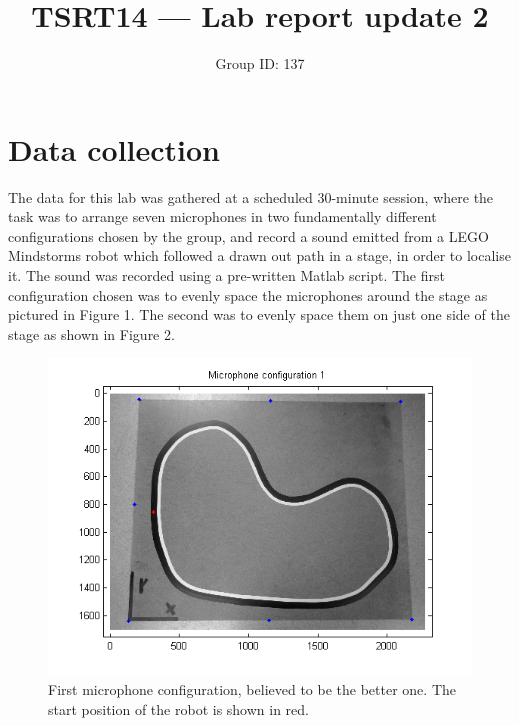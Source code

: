 \documentclass[11pt]{article}
\title{TSRT14 --- Lab report update 2}
\author{Group ID: 137}
\begin{document}
\maketitle
\newpage
\section{Data collection}
The data for this lab was gathered at a scheduled 30-minute session, where the task was to arrange seven microphones in two fundamentally different configurations chosen by the group, and record a sound emitted from a LEGO Mindstorms robot which followed a drawn out path in a stage, in order to localise it. The sound was recorded using a pre-written Matlab script. The first configuration chosen was to evenly space the microphones around the stage as pictured in Figure 1. The second was to evenly space them on just one side of the stage as shown in Figure 2.
\begin{figure}[h!]
\centering
\includegraphics[width=\textwidth]{microphone_configuration_1.png}
\caption{First microphone configuration, believed to be the better one. The start position of the robot is shown in red.}
\end{figure}
\end{document}
